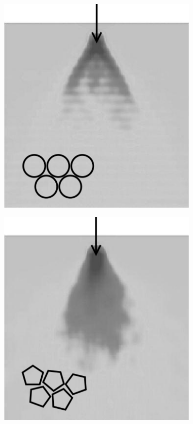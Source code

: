\begin{figure}[H]
    \centering
    \begin{minipage}{.45\linewidth}
        \centering
        \includegraphics[width=0.9\textwidth]{04-figuras/Funcao_Resposta1.png}
        \label{fig:stress_response:circle}
    \end{minipage}
    \begin{minipage}{.45\linewidth}
        \centering
        \includegraphics[width=0.9\textwidth]{04-figuras/Funcao_Resposta2.png}

\end{minipage}
\end{figure}

